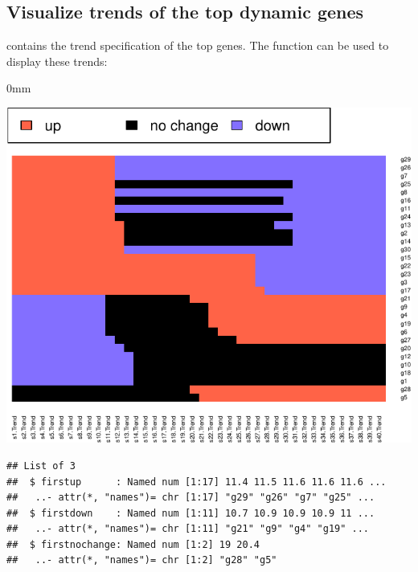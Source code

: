 \documentclass{article}
\begin{document}
\subsection{Visualize trends of the top dynamic genes}

 contains the trend specification of the top genes.
The function  can be used to display these trends:

\begin{knitrout}
\color{fgcolor}\begin{kframe}
\begin{alltt}
 \hlkwb{<-} 
\end{alltt}
\end{kframe}\begin{adjustwidth}{\fltoffset}{0mm}

{\centering \includegraphics[width=.8\textwidth]{figure/unnamed-chunk-6-1} 

}

\end{adjustwidth}\begin{kframe}\begin{alltt}
\end{alltt}
\begin{verbatim}
## List of 3
##  $ firstup      : Named num [1:17] 11.4 11.5 11.6 11.6 11.6 ...
##   ..- attr(*, "names")= chr [1:17] "g29" "g26" "g7" "g25" ...
##  $ firstdown    : Named num [1:11] 10.7 10.9 10.9 10.9 11 ...
##   ..- attr(*, "names")= chr [1:11] "g21" "g9" "g4" "g19" ...
##  $ firstnochange: Named num [1:2] 19 20.4
##   ..- attr(*, "names")= chr [1:2] "g28" "g5"
\end{verbatim}
\end{kframe}
\end{knitrout}
\end{document}
